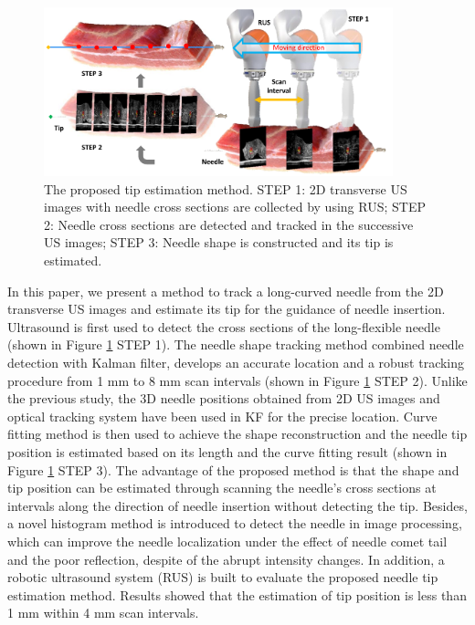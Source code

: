 \documentclass[journal,article,submit,moreauthors,pdftex]{Definitions/mdpi}
\begin{document}
\begin{figure}[H]
\centering
\includegraphics[width= 0.9\textwidth]{figures/2/f1.pdf}
\captionsetup{width=16 cm,justification=centering}
\caption{The proposed tip estimation method. STEP 1: 2D transverse US images with needle cross sections are collected by using RUS; STEP 2: Needle cross sections are detected and tracked in the successive US images; STEP 3: Needle shape is constructed and its tip is estimated.}\label{fig:1}
\end{figure}

In this paper, we present a method to track a long-curved needle from the 2D transverse US images and estimate its tip for the guidance of needle insertion.
Ultrasound is first used to detect the cross sections of the long-flexible needle (shown in Figure \ref{fig:1} STEP 1).
The needle shape tracking method combined needle detection with Kalman filter, develops an accurate location and a robust tracking procedure from 1 mm to 8 mm scan intervals (shown in Figure \ref{fig:1} STEP 2).
Unlike the previous study\cite{Waine2016a}, the 3D needle positions obtained from 2D US images and optical tracking system have been used in KF for the precise location.
Curve fitting method is then used to achieve the shape reconstruction and the needle tip position is estimated based on its length and the curve fitting result (shown in Figure \ref{fig:1} STEP 3).
The advantage of the proposed method is that the shape and tip position can be estimated through scanning the needle's cross sections at intervals along the direction of needle insertion without detecting the tip.
Besides, a novel histogram method is introduced to detect the needle in image processing, which can improve the needle localization under the effect of needle comet tail and the poor reflection, despite of the abrupt intensity changes.
In addition, a robotic ultrasound system (RUS)\cite{Priester2013} is built to evaluate the proposed needle tip estimation method. Results showed that the estimation of tip position is less than 1 mm within 4 mm scan intervals.
\end{document}

